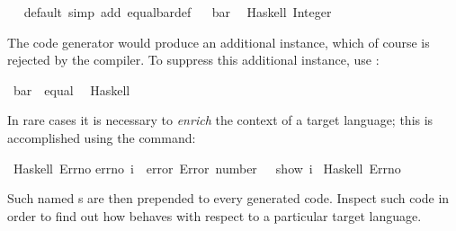 \begin{isabellebody}
\isanewline
{}\isamarkupfalse%
\ \isamarkupfalse%
\ default\ {\isacharparenleft}simp\ add{\isacharcolon}\ equal{\isacharunderscore}bar{\isacharunderscore}def{\isacharparenright}\isanewline
\isanewline
{}\isamarkupfalse%
%
\endisatagquote
{\isafoldquote}%
%
\isadelimquote
%
\endisadelimquote
%
\isadelimquotett
\ %
\endisadelimquotett
%
\isatagquotett
{}\isamarkupfalse%
\ bar\isanewline
\ \ {\isacharparenleft}Haskell\ {\isachardoublequoteopen}Integer{\isachardoublequoteclose}{\isacharparenright}%
\endisatagquotett
{\isafoldquotett}%
%
\isadelimquotett
%
\endisadelimquotett
%
\begin{isamarkuptext}%
\noindent The code generator would produce an additional instance,
  which of course is rejected by the  compiler.  To
  suppress this additional instance, use \hypertarget{command.code-instance}{\hyperlink{command.code-instance}{\mbox{}}}:%
\end{isamarkuptext}%
\isamarkuptrue%
%
\isadelimquotett
%
\endisadelimquotett
%
\isatagquotett
{}\isamarkupfalse%
\ bar\ {\isacharcolon}{\isacharcolon}\ equal\isanewline
\ \ {\isacharparenleft}Haskell\ {\isacharminus}{\isacharparenright}%
\endisatagquotett
{\isafoldquotett}%
%
\isadelimquotett
%
\endisadelimquotett
%
\isamarkuptrue%
%
\begin{isamarkuptext}%
In rare cases it is necessary to \emph{enrich} the context of a
  target language; this is accomplished using the \hypertarget{command.code-include}{\hyperlink{command.code-include}{\mbox{}}} command:%
\end{isamarkuptext}%
\isamarkuptrue%
%
\isadelimquotett
%
\endisadelimquotett
%
\isatagquotett
{}\isamarkupfalse%
\ Haskell\ {\isachardoublequoteopen}Errno{\isachardoublequoteclose}\isanewline
{\isacharverbatimopen}errno\ i\ {\isacharequal}\ error\ {\isacharparenleft}{\isachardoublequote}Error\ number{\isacharcolon}\ {\isachardoublequote}\ {\isacharplus}{\isacharplus}\ show\ i{\isacharparenright}{\isacharverbatimclose}\isanewline
\isanewline
{}\isamarkupfalse%
\ Haskell\ Errno%
\endisatagquotett
{\isafoldquotett}%
%
\isadelimquotett
%
\endisadelimquotett
%
\begin{isamarkuptext}%
\noindent Such named s are then prepended to every
  generated code.  Inspect such code in order to find out how
  \hyperlink{command.code-include}{\mbox{}} behaves with respect to a particular
  target language.%
\end{isamarkuptext}%
\isamarkuptrue%
%
\isadelimtheory
%
\endisadelimtheory
%
\isatagtheory
{}\isamarkupfalse%
%
\endisatagtheory
{\isafoldtheory}%
%
\isadelimtheory
%
\endisadelimtheory
\isanewline
\end{isabellebody}%
